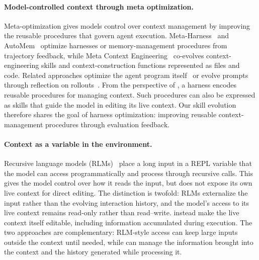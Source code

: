 \paragraph{Model-controlled context through meta optimization.}
Meta-optimization gives models control over context management by improving the reusable procedures that govern agent execution. Meta-Harness~\citep{lee2026meta} and AutoMem~\citep{wu2026automem} optimize harnesses or memory-management procedures from trajectory feedback, while Meta Context Engineering~\citep{ye2026meta} co-evolves context-engineering skills and context-construction functions represented as files and code. Related approaches optimize the agent program itself~\citep{zhang2025darwin,zhang2026hyperagents} or evolve prompts through reflection on rollouts~\citep{agrawal2026gepa}.
From the perspective of \oursplural{}, a harness encodes reusable procedures for managing context. Such procedures can also be expressed as skills that guide the model in editing its live context. Our skill evolution therefore shares the goal of harness optimization: improving reusable context-management procedures through evaluation feedback.

\paragraph{Context as a variable in the environment.}
Recursive language models (RLMs)~\citep{zhang2025recursive} place a long input in a REPL variable that the model can access programmatically and process through recursive calls. This gives the model control over how it reads the input, but does not expose its own live context for direct editing. The distinction is twofold: RLMs externalize the input rather than the evolving interaction history, and the model's access to its live context remains read-only rather than read--write. \oursplural{} instead make the live context itself editable, including information accumulated during execution.
The two approaches are complementary: RLM-style access can keep large inputs outside the context until needed, while \oursplural{} can manage the information brought into the context and the history generated while processing it.


